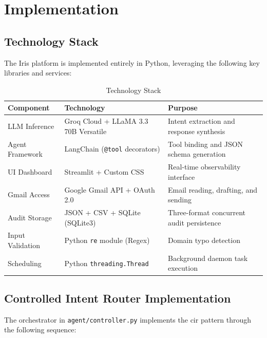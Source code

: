 \chapter{Implementation}

\section{Technology Stack}

The Iris platform is implemented entirely in Python, leveraging the following key libraries and services:

\begin{table}[H]
\centering
\caption{Technology Stack}
\begin{tabularx}{\textwidth}{l l X}
\toprule
\textbf{Component} & \textbf{Technology} & \textbf{Purpose} \\
\midrule
LLM Inference   & Groq Cloud + LLaMA 3.3 70B Versatile & Intent extraction and response synthesis \\
Agent Framework & LangChain (\texttt{@tool} decorators) & Tool binding and JSON schema generation \\
UI Dashboard    & Streamlit + Custom CSS & Real-time observability interface \\
Gmail Access    & Google Gmail API + OAuth 2.0 & Email reading, drafting, and sending \\
Audit Storage   & JSON + CSV + SQLite (SQLite3) & Three-format concurrent audit persistence \\
Input Validation& Python \texttt{re} module (Regex) & Domain typo detection \\
Scheduling      & Python \texttt{threading.Thread} & Background daemon task execution \\
\bottomrule
\end{tabularx}
\end{table}

\section{Controlled Intent Router Implementation}

The orchestrator in \texttt{agent/controller.py} implements the \gls{cir} pattern through the following sequence:

